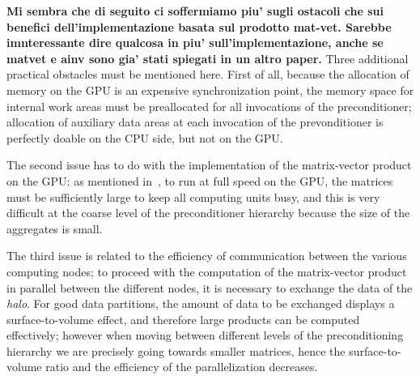 \textbf{Mi sembra che di seguito ci soffermiamo piu' sugli ostacoli che sui benefici dell'implementazione
basata sul prodotto mat-vet. Sarebbe imnteressante dire qualcosa in piu' sull'implementazione, anche se matvet e ainv sono gia' stati spiegati in un altro paper.}
Three additional practical obstacles must be mentioned here. 
First of all,  because the allocation of memory
on the GPU is an expensive synchronization point,  the
memory space for internal work areas must be preallocated for all
invocations  of the preconditioner; allocation of auxiliary data areas at
each invocation of the prevonditioner is perfectly doable on the CPU
side, but not  on the GPU. 

The second issue has to do with the implementation of the
matrix-vector product on the GPU: as mentioned
in~\cite{Filippone:2017:SMM:3034774.3017994}, to run at full speed on
the GPU, the matrices must be  sufficiently large to keep all
computing units busy, and this is very difficult at the coarse level
of the preconditioner hierarchy because the size of the aggregates is
small. 

The third issue is related to the efficiency of communication between
the various computing nodes; to proceed with the computation of the
matrix-vector product in parallel between the different nodes, it is
necessary to exchange the data of the \emph{halo}. For good data
partitions, the amount of data to be exchanged displays a
surface-to-volume effect, and therefore large products can be computed
effectively; however when moving between different levels of the
preconditioning hierarchy we are precisely going towards smaller
matrices, hence the surface-to-volume ratio and the efficiency of the
parallelization decreases. %
